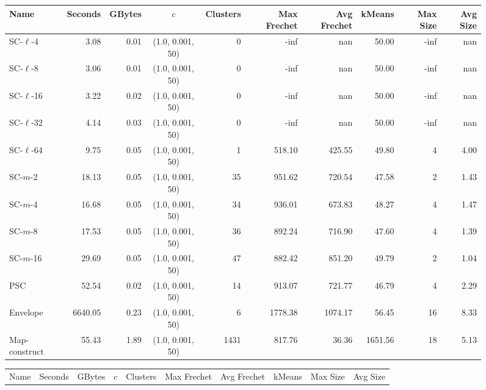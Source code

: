 \documentclass[11pt]{article}
\begin{document}
\clearpage
\newpage 
%
\clearpage
\begin{figure} \begin{center}
    \begin{minipage}{\textwidth}
    {
    \begin{tabular}{@{}lrrcrrrrrr@{}}
        \toprule
        Name & Seconds & GBytes & $c$ & Clusters & Max Frechet & Avg Frechet & kMeans & Max Size & Avg Size\\
        \midrule
        SC-$\ell$-4 & 3.08 & 0.01 & (1.0, 0.001, 50) & 0 & -inf & nan & 50.00 & -inf & nan\\
        SC-$\ell$-8 & 3.06 & 0.01 & (1.0, 0.001, 50) & 0 & -inf & nan & 50.00 & -inf & nan\\
        SC-$\ell$-16 & 3.22 & 0.02 & (1.0, 0.001, 50) & 0 & -inf & nan & 50.00 & -inf & nan\\
        SC-$\ell$-32 & 4.14 & 0.03 & (1.0, 0.001, 50) & 0 & -inf & nan & 50.00 & -inf & nan\\
        SC-$\ell$-64 & 9.75 & 0.05 & (1.0, 0.001, 50) & 1 & 518.10 & 425.55 & 49.80 & 4 & 4.00\\
        SC-$m$-2 & 18.13 & 0.05 & (1.0, 0.001, 50) & 35 & 951.62 & 720.54 & 47.58 & 2 & 1.43\\
        SC-$m$-4 & 16.68 & 0.05 & (1.0, 0.001, 50) & 34 & 936.01 & 673.83 & 48.27 & 4 & 1.47\\
        SC-$m$-8 & 17.53 & 0.05 & (1.0, 0.001, 50) & 36 & 892.24 & 716.90 & 47.60 & 4 & 1.39\\
        SC-$m$-16 & 29.69 & 0.05 & (1.0, 0.001, 50) & 47 & 882.42 & 851.20 & 49.79 & 2 & 1.04\\
        PSC & 52.54 & 0.02 & (1.0, 0.001, 50) & 14 & 913.07 & 721.77 & 46.79 & 4 & 2.29\\
        Envelope & 6640.05 & 0.23 & (1.0, 0.001, 50) & 6 & 1778.38 & 1074.17 & 56.45 & 16 & 8.33\\
        Map-construct & 55.43 & 1.89 & (1.0, 0.001, 50) & 1431 & 817.76 & 36.36 & 1651.56 & 18 & 5.13\\
        \bottomrule
    \end{tabular}
    }
    {
    \begin{tabular}{@{}lrrcrrrrrr@{}}
        \toprule
        Name & Seconds & GBytes & $c$ & Clusters & Max Frechet & Avg Frechet & kMeans & Max Size & Avg Size\\

\end{tabular}}
\end{minipage}
\end{center}
\end{figure}
\end{document}
